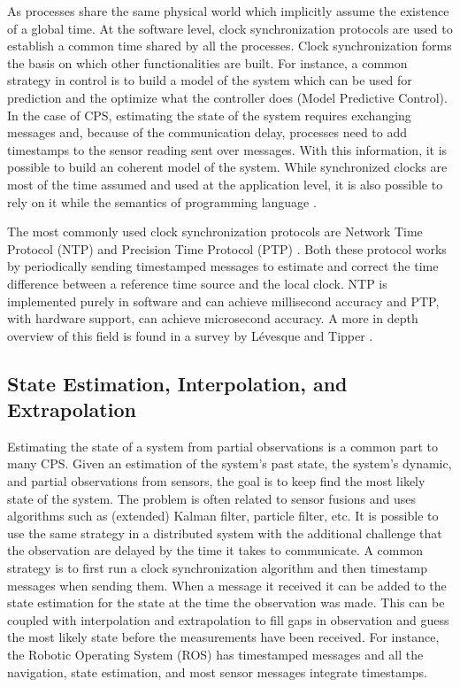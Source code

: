 \documentclass[
graybox,
envcountchap
]{svmult}
\begin{document}
\begin{bibunit}
    As processes share the same physical world which implicitly assume the existence of a global time.
    At the software level, clock synchronization protocols are used to establish a common time shared by all the processes.
    Clock synchronization forms the basis on which other functionalities are built.
    For instance, a common strategy in control is to build a model of the system which can be used for prediction and the optimize what the controller does (Model Predictive Control).
    In the case of CPS, estimating the state of the system requires exchanging messages and, because of the communication delay, processes need to add timestamps to the sensor reading sent over messages.
    With this information, it is possible to build an coherent model of the system.
    While synchronized clocks are most of the time assumed and used at the application level, it is also possible to rely on it while the semantics of programming language \cite{DBLP:conf/dac/LohstrohSGWGSL19,DBLP:conf/emsoft/LohstrohSJWL19}.
    
    The most commonly used clock synchronization protocols are Network Time Protocol (NTP) \cite{rfc5905} and Precision Time Protocol (PTP) \cite{4579760}.
    Both these protocol works by periodically sending timestamped messages to estimate and correct the time difference between a reference time source and the local clock.
    NTP is implemented purely in software and can achieve millisecond accuracy and PTP, with hardware support, can achieve microsecond accuracy.
    A more in depth overview of this field is found in a survey by L\'evesque and Tipper \cite{DBLP:journals/comsur/LevesqueT16}.
  
    \subsection{State Estimation, Interpolation, and Extrapolation}
    
    Estimating the state of a system from partial observations is a common part to many CPS.
    Given an estimation of the system's past state, the system's dynamic, and partial observations from sensors, the goal is to keep find the most likely state of the system.
    The problem is often related to sensor fusions and uses algorithms such as (extended) Kalman filter, particle filter, etc.
    It is possible to use the same strategy in a distributed system with the additional challenge that the observation are delayed by the time it takes to communicate.
    A common strategy is to first run a clock synchronization algorithm and then timestamp messages when sending them.
    When a message it received it can be added to the state estimation for the state at the time the observation was made.
    This can be coupled with interpolation and extrapolation to fill gaps in observation and guess the most likely state before the measurements have been received.
    For instance, the Robotic Operating System (ROS) \cite{ROS} has timestamped messages and all the navigation, state estimation, and most sensor messages integrate timestamps.
   

\end{bibunit}
\end{document}
